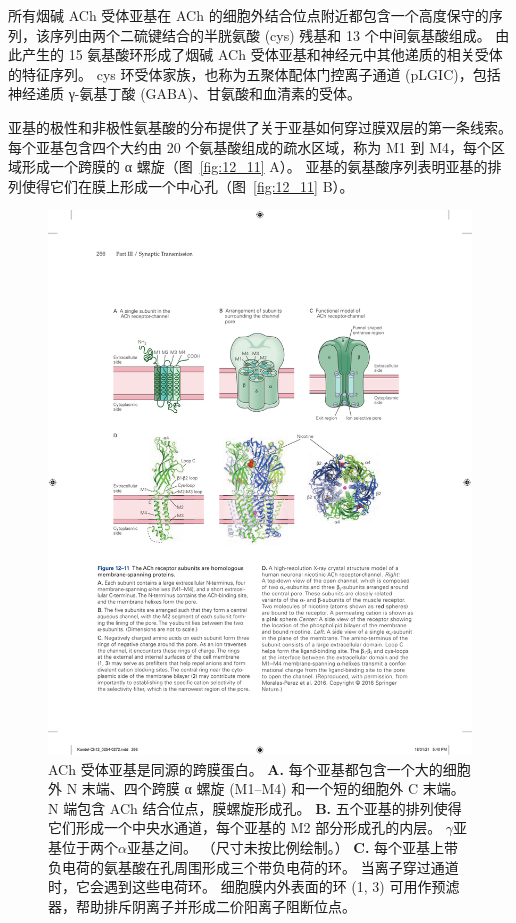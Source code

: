 所有烟碱 ACh 受体亚基在 ACh 的细胞外结合位点附近都包含一个高度保守的序列，该序列由两个二硫键结合的半胱氨酸 (cys) 残基和 13 个中间氨基酸组成。
由此产生的 15 氨基酸环形成了烟碱 ACh 受体亚基和神经元中其他递质的相关受体的特征序列。
cys 环受体家族，也称为五聚体配体门控离子通道 (pLGIC)，包括神经递质 γ-氨基丁酸 (GABA)、甘氨酸和血清素的受体。


亚基的极性和非极性氨基酸的分布提供了关于亚基如何穿过膜双层的第一条线索。
每个亚基包含四个大约由 20 个氨基酸组成的疏水区域，称为 M1 到 M4，每个区域形成一个跨膜的 α 螺旋（图~\ref{fig:12_11} A）。
亚基的氨基酸序列表明亚基的排列使得它们在膜上形成一个中心孔（图~\ref{fig:12_11} B）。


\begin{figure}[htbp]
	\centering
	\includegraphics[width=0.85\linewidth]{chap12/fig_12_11}
	\caption{ACh 受体亚基是同源的跨膜蛋白。
		\textbf{A.} 每个亚基都包含一个大的细胞外 N 末端、四个跨膜 α 螺旋 (M1–M4) 和一个短的细胞外 C 末端。
		N 端包含 ACh 结合位点，膜螺旋形成孔。
		\textbf{B.} 五个亚基的排列使得它们形成一个中央水通道，每个亚基的 M2 部分形成孔的内层。
		$\gamma$亚基位于两个$\alpha$亚基之间。 （尺寸未按比例绘制。）
		\textbf{C.} 每个亚基上带负电荷的氨基酸在孔周围形成三个带负电荷的环。
		当离子穿过通道时，它会遇到这些电荷环。
		细胞膜内外表面的环 (1, 3) 可用作预滤器，帮助排斥阴离子并形成二价阳离子阻断位点。
}
\end{figure}
